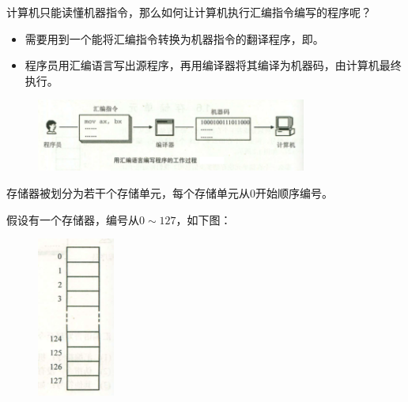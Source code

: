 \begin{frame}\ft{\secname}
  \begin{question}{}
    计算机只能读懂机器指令，那么如何让计算机执行汇编指令编写的程序呢？
  \end{question}
  \pause 

  \begin{itemize}
  \item[]
    需要用到一个能将汇编指令转换为机器指令的翻译程序，即。\\[0.1in]
  \item[]
    程序员用汇编语言写出源程序，再用编译器将其编译为机器码，由计算机最终执行。
  \end{itemize}

  \begin{figure}
    \centering
    \includegraphics[width=3.5in]{ch01/images/asm_process}
  \end{figure}
\end{frame}
% 
\begin{frame}
  存储器被划分为若干个存储单元，每个存储单元从$0$开始顺序编号。

  \begin{exam}{}
    假设有一个存储器，编号从$0\sim 127$，如下图：
  \begin{figure}
    \centering
    \includegraphics[width=1in]{ch01/images/cunchudanyuan}
  \end{figure}
  \end{exam}
\end{frame}
% 
